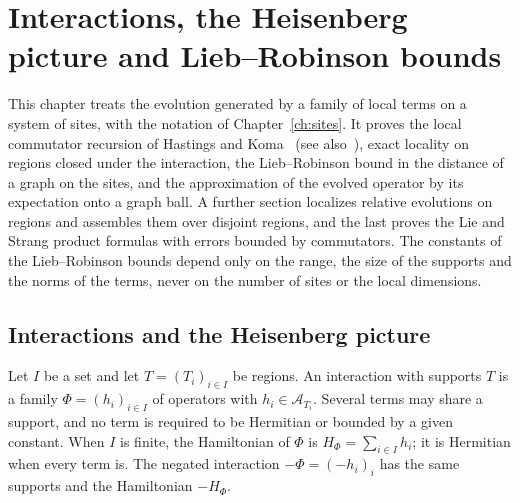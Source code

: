 \chapter{Interactions, the Heisenberg picture and Lieb--Robinson bounds}
\label{ch:dynamics}

This chapter treats the evolution generated by a family of local terms on a
system of sites, with the notation of Chapter~\ref{ch:sites}. It proves the
local commutator recursion of Hastings and Koma~\cite{HastingsKoma2006SpectralGap}
(see also~\cite{NachtergaeleOgataSims2006Propagation}), exact locality on regions
closed under the interaction, the Lieb--Robinson bound in the distance of a
graph on the sites, and the approximation of the evolved operator by its
expectation onto a graph ball. A further section localizes relative evolutions
on regions and assembles them over disjoint regions, and the last proves the Lie
and Strang product formulas with errors bounded by commutators. The constants of the
Lieb--Robinson bounds depend only on the range, the
size of the supports and the norms of the terms, never on the number of sites
or the local dimensions.

\section{Interactions and the Heisenberg picture}
\label{sec:dynamics_interaction}

\begin{definition}[Interaction]
    \label{def:dynamics_interaction}
    \leanok
    Let $I$ be a set and let $T=(T_i)_{i\in I}$ be regions. An interaction with
    supports $T$ is a family $\Phi=(h_i)_{i\in I}$ of operators with
    $h_i\in\mathcal A_{T_i}$. Several terms may share a support, and no term is
    required to be Hermitian or bounded by a given constant. When $I$ is finite,
    the Hamiltonian of $\Phi$ is $H_\Phi=\sum_{i\in I}h_i$; it is Hermitian when
    every term is. The negated interaction $-\Phi=(-h_i)_i$ has the same
    supports and the Hamiltonian $-H_\Phi$.
\end{definition}

